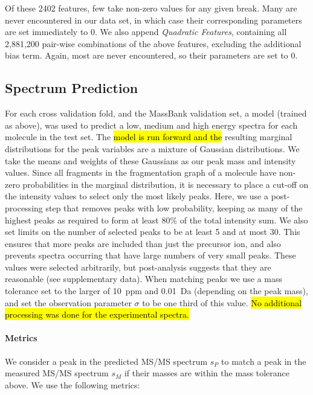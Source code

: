 Of these 2402 features, few take non-zero values for any given break. 
Many are never encountered in our data set, in which case their corresponding parameters are set immediately to 0.
We also append \emph{Quadratic Features}, containing all 2,881,200 pair-wise combinations of the above features, excluding the additional bias term. Again, most are never encountered, so their parameters are set to 0.

\subsection{Spectrum Prediction}
\label{sec:SpectrumPrediction}

For each cross validation fold, and the MassBank validation set, a model (trained as above), was used to predict a low, medium and high energy spectra for each molecule in the test set. 
The \hl{model is run forward and the} resulting marginal distributions for the peak variables are a mixture of Gaussian distributions. 
We take the means and weights of these Gaussians as our peak mass and intensity values. 
Since all fragments in the fragmentation graph of a molecule have non-zero probabilities in the marginal distribution, it is necessary to place a cut-off on the intensity values to select only the most likely peaks. 
Here, we use a post-processing step that removes peaks with low probability, keeping as many of the highest peaks as required to form at least 80\% of the total intensity sum.  
We also set limits on the number of selected peaks to be at least 5 and at most 30. This ensures that more peaks are included than just the precursor ion, and also prevents spectra occurring that have large numbers of very small peaks. These values were selected arbitrarily, but post-analysis suggests that they are reasonable (see supplementary data). 
When matching peaks we use a mass tolerance set to the larger of 10~ppm and 0.01~Da (depending on the peak mass), and set the observation parameter $\sigma$ to be one third of this value.
\hl{No additional processing was done for the experimental spectra.}

\paragraph{Metrics}
We consider a peak in the predicted MS/MS spectrum $s_{P}$ to match a peak in the measured MS/MS spectrum $s_{M}$ if their masses are within the mass tolerance above.
We use the following metrics:

